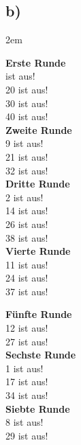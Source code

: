 \documentclass[titlepage]{article}
\newcommand{\n}{\newline}
\begin{document}
		
			\endgroup
			
			\newpage
			\subsection*{b)}
			\begingroup
			\leftskip2em
			\begin{multicols}{3}

				\noindent
				\textbf{Erste Runde}\\
				 ist aus!\\
				20 ist aus!\\
				30 ist aus!\\
				40 ist aus!\\
				\n
				\textbf{Zweite Runde}\\
				9 ist aus!\\
				21 ist aus!\\
				32 ist aus!\\
				\n
				\textbf{Dritte Runde}\\
				2 ist aus!\\
				14 ist aus!\\
				26 ist aus!\\
				38 ist aus!\\
				\n
				\textbf{Vierte Runde}\\
				11 ist aus!\\
				24 ist aus!\\
				37 ist aus!\\
				\n
				\columnbreak
				
				\noindent
				\textbf{Fünfte Runde}\\
				12 ist aus!\\
				27 ist aus!\\
				\n
				\textbf{Sechste Runde}\\
				1 ist aus!\\
				17 ist aus!\\
				34 ist aus!\\
				\n
				\textbf{Siebte Runde}\\
				8 ist aus!\\
				29 ist aus!\\
				\n
				

\end{multicols}
\end{document}
